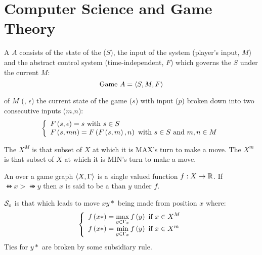 \chapter{Computer Science and Game Theory}

\begin{defi}
A  $A$ consists of the state of the  ($S$), the input of the system (player's input, $M$) and the abstract control system (time-independent, $F$) which governs the $S$ under the current $M$:
\begin{equation}
\mbox{Game }A=\left\langle S,M,F\right\rangle
\end{equation}
\cite{journals/procedia/KosmadoudiLRSLSS12}
\end{defi}

\begin{defi}
 of $M$ (, $\epsilon$) the current state of the game ($s$) with input ($p$) broken down into two consecutive inputs ($m$,$n$):
\begin{equation}
\left\{\begin{array}{l}
F\left(s,\epsilon\right)=s\mbox{ with }s\in S\\
F\left(s,mn\right)=F\left(F\left(s,m\right),n\right)\mbox{ with } s\in S\mbox{ and }m,n\in M
\end{array}\right.
\end{equation}
\cite{journals/procedia/KosmadoudiLRSLSS12}
\end{defi}

\begin{defi}
The  $X^M$ is that subset of $X$ at which it is MAX's turn to make a move. The  $X^m$ is that subset of $X$ at which it is MIN's turn to make a move.
\cite{conf/ijcai/Boffey73}
\end{defi}

\begin{defi}
An  over a game graph $\left\langle X,\Gamma\right\rangle$ is a single valued function $f:X \rightarrow \mathbb{R}$. If $\ffun{x}>\ffun{y}$ then $x$ is said to be a  than $y$ under $f$.
\cite{conf/ijcai/Boffey73}
\end{defi}

\begin{defi}
$\mathcal{S}_o$ is that  which leads to move $xy*$ being made from position $x$ where:
\begin{equation}
\left\{\begin{array}{l}f\left(x*\right)=\displaystyle\max_{y\in\Gamma_x}f\left(y\right)\mbox{ if }x\in X^M\\
f\left(x*\right)=\displaystyle\min_{y\in\Gamma_x}f\left(y\right)\mbox{ if }x\in X^m\end{array}\right.
\end{equation}
Ties for $y*$ are broken by some subsidiary rule.
\cite{conf/ijcai/Boffey73}
\end{defi}

